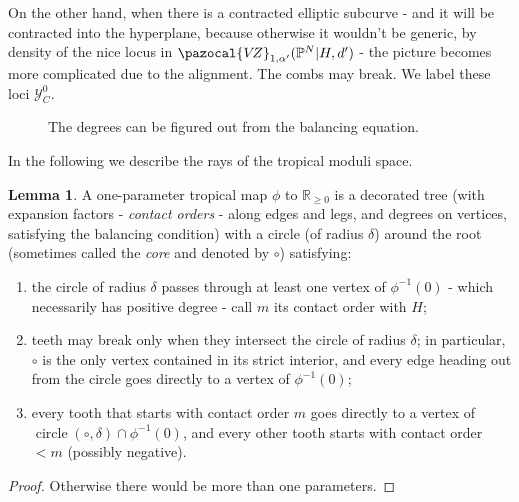 \documentclass[11pt]{amsart}
\newcommand{\PP}{\mathbb P}
\newcommand{\VZ}{\pazocal{V\!Z}}
\theoremstyle{definition}
\newtheorem{lem}[thm]{Lemma}
\theoremstyle{definition}
\begin{document}
On the other hand, when there is a contracted elliptic subcurve - and it will be contracted into the hyperplane, because otherwise it wouldn't be generic, by density of the nice locus in $\VZ_{1,\alpha^\prime}(\PP^N|H,d^\prime)$ - the picture becomes more complicated due to the alignment. The combs may break. We label these loci $\mathcal{Y}_C^0$.
\begin{figure}

 
 \caption{The degrees can be figured out from the balancing equation.}
\end{figure}

In the following we describe the rays of the tropical moduli space.
\begin{lem}
 A one-parameter tropical map $\phi$ to $\mathbb R_{\geq 0}$ is a decorated tree (with expansion factors - \emph{contact orders} - along edges and legs, and degrees on vertices, satisfying the balancing condition) with a circle (of radius $\delta$) around the root (sometimes called the \emph{core} and denoted by $\circ$) satisfying:
 \begin{enumerate}
 \item the circle of radius $\delta$ passes through at least one vertex of $\phi^{-1}(0)$ - which necessarily has positive degree - call $m$ its contact order with $H$;
 \item teeth may break only when they intersect the circle of radius $\delta$; in particular, $\circ$ is the only vertex contained in its strict interior, and every edge heading out from the circle goes directly to a vertex of $\phi^{-1}(0)$;
 \item every tooth that starts with contact order $m$ goes directly to a vertex of $\operatorname{circle}(\circ,\delta)\cap\phi^{-1}(0)$, and every other tooth starts with contact order $<m$ (possibly negative).
 \end{enumerate}
\end{lem}
\begin{proof}
 Otherwise there would be more than one parameters.
\end{proof}
\end{document}
